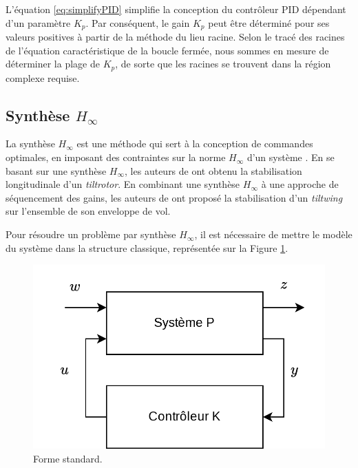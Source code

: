   L'équation \eqref{eq:simplifyPID} simplifie la conception du contrôleur PID dépendant d'un paramètre $K_{p}$. Par conséquent, le gain $K_{p}$ peut être déterminé pour ses valeurs positives à partir de la méthode du lieu racine. Selon le tracé des racines de l'équation caractéristique de la boucle fermée, nous sommes en mesure de déterminer la plage de $K_{p}$, de sorte que les racines se trouvent dans la région complexe requise. 

\subsection*{Synthèse $H_{\infty}$}
La synthèse $H_{\infty}$ est une méthode qui sert à la conception de commandes optimales, en imposant des contraintes sur la norme $H_{\infty}$ d'un système \cite{DGKF89}. En se basant sur une synthèse $H_{\infty}$, les auteurs de \cite{SunYang2009} ont obtenu la stabilisation longitudinale d'un \textit{tiltrotor}. En combinant une synthèse $H_{\infty}$ à une approche de séquencement des gains, les auteurs de \cite{DickesonMix2005, DickesonCifdaloz2006,DickesonMiles2007} ont proposé la stabilisation d'un \textit{tiltwing} sur l'ensemble de son enveloppe de vol.

Pour résoudre un problème par synthèse $H_{\infty}$, il est nécessaire de mettre le modèle du système dans la structure classique, représentée sur la Figure \ref{fig:schemalft}. 

\begin{figure}[ht!]
    \centerline{
    \includegraphics[trim=0cm 0cm 0cm 0cm,clip,width=0.5\columnwidth]{figures/lft.png}}
    \caption{Forme standard.}
    \label{fig:schemalft}
\end{figure}

